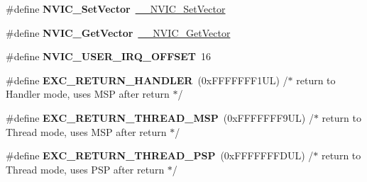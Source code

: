 \begin{DoxyCompactItemize}
\mbox{\label{group___c_m_s_i_s___core___n_v_i_c_functions_ga804af63bb4c4c317387897431814775d}} 
\#define {\bfseries N\+V\+I\+C\+\_\+\+Set\+Vector}~\hyperlink{group___c_m_s_i_s___core___n_v_i_c_functions_ga0df355460bc1783d58f9d72ee4884208}{\+\_\+\+\_\+\+N\+V\+I\+C\+\_\+\+Set\+Vector}
\item 
\mbox{\label{group___c_m_s_i_s___core___n_v_i_c_functions_ga955eb1c33a3dcc62af11a8385e8c0fc8}} 
\#define {\bfseries N\+V\+I\+C\+\_\+\+Get\+Vector}~\hyperlink{group___c_m_s_i_s___core___n_v_i_c_functions_ga44b665d2afb708121d9b10c76ff00ee5}{\+\_\+\+\_\+\+N\+V\+I\+C\+\_\+\+Get\+Vector}
\item 
\mbox{\label{group___c_m_s_i_s___core___n_v_i_c_functions_ga8045d905a5ca57437d8e6f71ffcb6df5}} 
\#define {\bfseries N\+V\+I\+C\+\_\+\+U\+S\+E\+R\+\_\+\+I\+R\+Q\+\_\+\+O\+F\+F\+S\+ET}~16
\item 
\mbox{\label{group___c_m_s_i_s___core___n_v_i_c_functions_gaa6fa2b10f756385433e08522d9e4632f}} 
\#define {\bfseries E\+X\+C\+\_\+\+R\+E\+T\+U\+R\+N\+\_\+\+H\+A\+N\+D\+L\+ER}~(0x\+F\+F\+F\+F\+F\+F\+F1\+U\+L)     /$\ast$ return to Handler mode, uses M\+S\+P after return                               $\ast$/
\item 
\mbox{\label{group___c_m_s_i_s___core___n_v_i_c_functions_gaea4703101b5e679f695e231f7ee72331}} 
\#define {\bfseries E\+X\+C\+\_\+\+R\+E\+T\+U\+R\+N\+\_\+\+T\+H\+R\+E\+A\+D\+\_\+\+M\+SP}~(0x\+F\+F\+F\+F\+F\+F\+F9\+U\+L)     /$\ast$ return to Thread mode, uses M\+S\+P after return                                $\ast$/
\item 
\mbox{\label{group___c_m_s_i_s___core___n_v_i_c_functions_ga9998daf0fbdf31dbc8f81cd604b58175}} 
\#define {\bfseries E\+X\+C\+\_\+\+R\+E\+T\+U\+R\+N\+\_\+\+T\+H\+R\+E\+A\+D\+\_\+\+P\+SP}~(0x\+F\+F\+F\+F\+F\+F\+F\+D\+U\+L)     /$\ast$ return to Thread mode, uses P\+S\+P after return                                $\ast$/
\item 
\mbox{\label{group___c_m_s_i_s___core___n_v_i_c_functions_ga3aa6648e1c3c09fbab1f543b9dcffc3a}} 

\end{DoxyCompactItemize}
